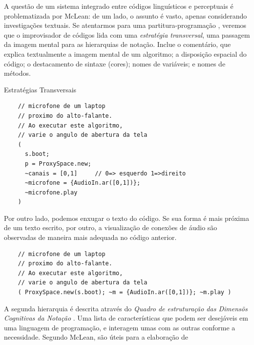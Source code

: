 A questão de um sistema integrado entre códigos linguísticos e perceptuais é problematizada por McLean: de um lado, o assunto é vasto, apenas considerando investigações textuais. Se atentarmos para uma partitura-programação , veremos que o improvisador de códigos lida com uma \emph{estratégia transversal}, uma passagem da imagem mental para as hierarquias de notação. Inclue o comentário, que explica textualmente a imagem mental de um algoritmo; a disposição espacial do código; o destacamento de sintaxe (cores); nomes de variáveis; e nomes de métodos.

\begin{example}{Estratégias Transversais}


  \begin{verbatim}
    // microfone de um laptop 
    // proximo do alto-falante.
    // Ao executar este algoritmo, 
    // varie o angulo de abertura da tela
    ( 
      s.boot;
      p = ProxySpace.new;
      ~canais = [0,1]     // 0=> esquerdo 1=>direito
      ~microfone = {AudioIn.ar([0,1])};
      ~microfone.play
    )
  \end{verbatim}

  Por outro lado, podemos enxugar o texto do código. Se sua forma é mais próxima de um texto escrito, por outro, a visualização de conexões de áudio são observadas de maneira mais adequada no código anterior.

  \begin{verbatim}
    // microfone de um laptop 
    // proximo do alto-falante.
    // Ao executar este algoritmo, 
    // varie o angulo de abertura da tela
    ( ProxySpace.new(s.boot); ~m = {AudioIn.ar([0,1])}; ~m.play )
  \end{verbatim}
\end{example}\label{ex:sc1}

A segunda hierarquia é descrita através do \emph{Quadro de estruturação das Dimensõs Cognitivas da Notação} . Uma lista de características que podem ser desejáveis em uma linguagem de programação, e interagem umas com as outras conforme a necessidade. Segundo McLean, são úteis para a elaboração de 


